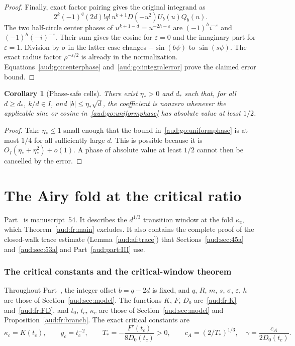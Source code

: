 \documentclass[11pt,a4paper]{article}
\numberwithin{equation}{section}
\newtheorem{corollary}[theorem]{Corollary}
\begin{document}
\begin{proof}
Finally, exact factor pairing gives the original integrand as
\[
 2^k(-1)^q(2d)!q!\,u^{k+1}D(-u^2)U_b(u)Q_b(u).
\]
The two half-circle center phases of $u^{k+1-d}=u^{-2h-\varepsilon}$ are $(-1)^hi^{-\varepsilon}$ and $(-1)^h(-i)^{-\varepsilon}$. Their sum gives the cosine for $\varepsilon=0$ and the imaginary part for $\varepsilon=1$. Division by $\sigma$ in the latter case changes $-\sin(b\psi)$ to $\sin(s\psi)$. The exact radius factor $\rho^{-\varepsilon/2}$ is already in the normalization. Equations~\eqref{aud:go:centerphase} and~\eqref{aud:go:integralerror} prove the claimed error bound.
\end{proof}

\begin{corollary}[Phase-safe cells]\label{aud:go:safecells}
There exist $\eta_*>0$ and $d_*$ such that, for all $d\ge d_*$, $k/d\in I$, and $|b|\le\eta_*\sqrt d$, the coefficient is nonzero whenever the applicable sine or cosine in~\eqref{aud:go:uniformphase} has absolute value at least $1/2$.
\end{corollary}
\begin{proof}
Take $\eta_*\le1$ small enough that the bound in~\eqref{aud:go:uniformphase} is at most $1/4$ for all sufficiently large $d$. This is possible because it is $O_I(\eta_*+\eta_*^2)+o(1)$. A phase of absolute value at least $1/2$ cannot then be cancelled by the error.
\end{proof}
\part{The Airy fold at the critical ratio}\label{aud:part:II}
Part~\ref{aud:part:II} is manuscript~54. It describes the $d^{1/3}$ transition window at the fold $\kappa_c$, which Theorem~\ref{aud:fr:main} excludes. It also contains the complete proof of the closed-walk trace estimate (Lemma~\ref{aud:af:trace}) that Sections~\ref{aud:sec:45a} and~\ref{aud:sec:53a} and Part~\ref{aud:part:III} use.

\section{The critical constants and the critical-window theorem}\label{aud:sec:afintro}
Throughout Part~\ref{aud:part:II}, the integer offset $b=q-2d$ is fixed, and $q$, $R$, $m$, $s$, $\sigma$, $\varepsilon$, $h$ are those of Section~\ref{aud:sec:model}. The functions $K$, $F$, $D_0$ are~\eqref{aud:fr:K} and~\eqref{aud:fr:FD}, and $t_0$, $t_c$, $\kappa_c$ are those of Section~\ref{aud:sec:model} and Proposition~\ref{aud:fr:branch}. The exact critical constants are
\begin{equation}\label{aud:af:constants}
 \kappa_c=K(t_c),\qquad y_c=t_c^{-2},\qquad
 T_*=-\frac{F'(t_c)}{8D_0(t_c)}>0,\qquad
 c_A=(2/T_*)^{1/3},\quad \gamma=\frac{c_A}{2D_0(t_c)}.
\end{equation}
\end{document}
